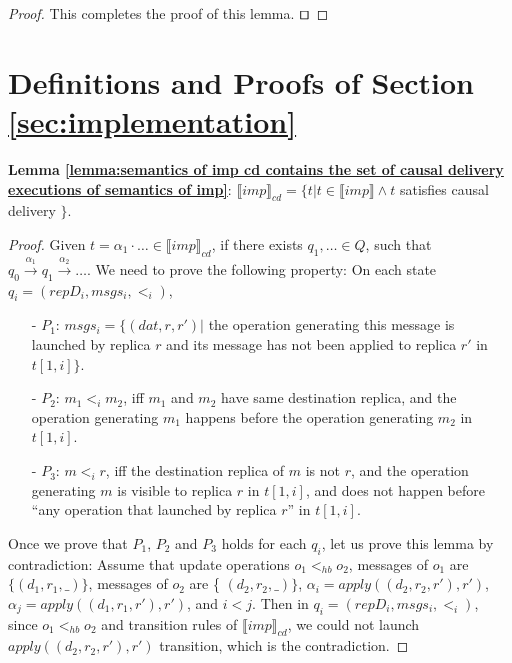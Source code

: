 {\begin {proof}
This completes the proof of this lemma. $\qed$
\end {proof}








\section{Definitions and Proofs of Section \ref{sec:implementation}}
\label{sec:appendix definitions and proofs of section implementation}



{\noindent \bf Lemma \ref{lemma:semantics of imp cd contains the set of causal delivery executions of semantics of imp}}: $\llbracket imp \rrbracket_{cd} = \{ t \vert t \in \llbracket imp \rrbracket \wedge t$ satisfies causal delivery $\}$.

\begin {proof}

Given $t = \alpha_1 \cdot \ldots \in \llbracket imp \rrbracket_{cd}$, if there exists $q_1,\ldots \in Q$, such that $q_0 {\xrightarrow{\alpha_1}} q_1 {\xrightarrow{\alpha_2}} \ldots$. We need to prove the following property: On each state $q_i=(repD_i,msgs_i,<_i)$,

\begin{itemize}
\setlength{\itemsep}{0.5pt}
\item[-] $P_1$: $msgs_i = \{ (dat,r,r') \vert$ the operation generating this message is launched by replica $r$ and its message has not been applied to replica $r'$ in $t[1,i]\}$.

\item[-] $P_2$: $m_1 <_i m_2$, iff $m_1$ and $m_2$ have same destination replica, and the operation generating $m_1$ happens before the operation generating $m_2$ in $t[1,i]$.

\item[-] $P_3$: $m <_i r$, iff the destination replica of $m$ is not $r$, and the operation generating $m$ is visible to replica $r$ in $t[1,i]$, and does not happen before ``any operation that launched by replica $r$'' in $t[1,i]$.
\end{itemize}

Once we prove that $P_1$, $P_2$ and $P_3$ holds for each $q_i$, let us prove this lemma by contradiction: Assume that update operations $o_1 <_{hb} o_2$, messages of $o_1$ are $\{ (d_1,r_1,\_) \}$, messages of $o_2$ are \{ $(d_2,r_2,\_) \}$, $\alpha_i = apply((d_2,r_2,r'),r')$, $\alpha_j = apply((d_1,r_1,r'),r')$, and $i<j$. Then in $q_i=(repD_i,msgs_i,<_i)$, since $o_1 <_{hb} o_2$ and transition rules of $\llbracket imp \rrbracket_{cd}$, we could not launch $apply((d_2,r_2,r'),r')$ transition, which is the contradiction.




\end{proof}}
